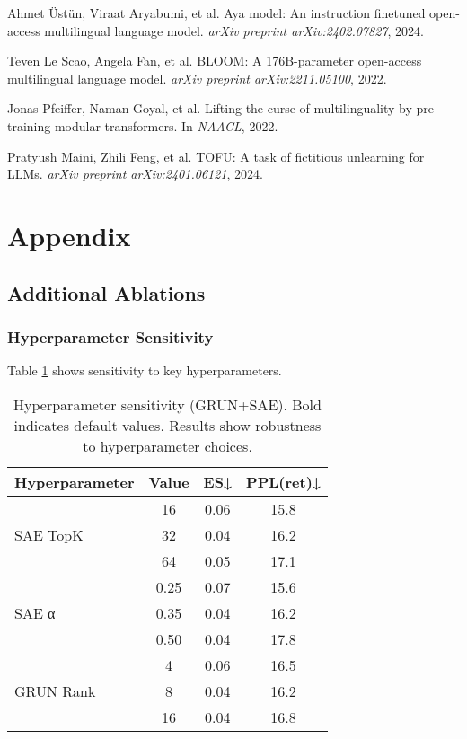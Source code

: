 \documentclass[11pt]{article}
\begin{document}
\begin{thebibliography}{99}
Ahmet Üstün, Viraat Aryabumi, et al.
\newblock Aya model: An instruction finetuned open-access multilingual language model.
\newblock \textit{arXiv preprint arXiv:2402.07827}, 2024.

Teven Le Scao, Angela Fan, et al.
\newblock BLOOM: A 176B-parameter open-access multilingual language model.
\newblock \textit{arXiv preprint arXiv:2211.05100}, 2022.

Jonas Pfeiffer, Naman Goyal, et al.
\newblock Lifting the curse of multilinguality by pre-training modular transformers.
\newblock In \textit{NAACL}, 2022.

Pratyush Maini, Zhili Feng, et al.
\newblock TOFU: A task of fictitious unlearning for LLMs.
\newblock \textit{arXiv preprint arXiv:2401.06121}, 2024.

\end{thebibliography}

\newpage
\appendix

\section{Appendix}

\subsection{Additional Ablations}

\subsubsection{Hyperparameter Sensitivity}

Table \ref{tab:hparam_sensitivity} shows sensitivity to key hyperparameters.

\begin{table}[h]
\centering
\small
\begin{tabular}{@{}lccc@{}}
\toprule
\textbf{Hyperparameter} & \textbf{Value} & \textbf{ES↓} & \textbf{PPL(ret)↓} \\
\midrule
\multirow{3}{*}{SAE TopK} & 16 & 0.06 & 15.8 \\
 & 32 & 0.04 & 16.2 \\
 & 64 & 0.05 & 17.1 \\
\midrule
\multirow{3}{*}{SAE α} & 0.25 & 0.07 & 15.6 \\
 & 0.35 & 0.04 & 16.2 \\
 & 0.50 & 0.04 & 17.8 \\
\midrule
\multirow{3}{*}{GRUN Rank} & 4 & 0.06 & 16.5 \\
 & 8 & 0.04 & 16.2 \\
 & 16 & 0.04 & 16.8 \\
\bottomrule
\end{tabular}
\caption{Hyperparameter sensitivity (GRUN+SAE). Bold indicates default values. Results show robustness to hyperparameter choices.}
\label{tab:hparam_sensitivity}
\end{table}
\end{document}
